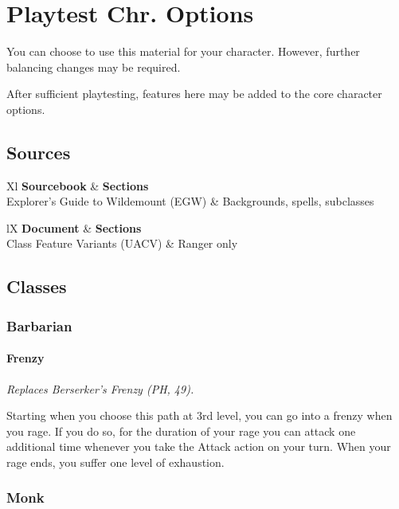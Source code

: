 \documentclass[House_Rules.tex]{subfiles}
\begin{document}
\chapter{Playtest Chr. Options}

You can choose to use this material for your character. However, further balancing changes may be required. 

After sufficient playtesting, features here may be added to the core character options.




\section{Sources}

\begin{DndTable}[]{Xl}
    \textbf{Sourcebook} & \textbf{Sections} \\
    Explorer's Guide to Wildemount (EGW) & Backgrounds, spells, subclasses \\
\end{DndTable}

\begin{DndTable}[header=Unearthed Arcana]{lX}
    \textbf{Document} & \textbf{Sections} \\
    Class Feature Variants (UACV) & Ranger only \\
\end{DndTable}




\section{Classes}

\subsection{Barbarian}

\subsubsection{Frenzy}
\textit{Replaces Berserker's Frenzy (PH, 49).}

Starting when you choose this path at 3rd level, you can go into a frenzy when you rage. If you do so, for the duration of your rage you can attack one additional time whenever you take the Attack action on your turn. When your rage ends, you suffer one level of exhaustion.

\subsection{Monk}
\end{document}
